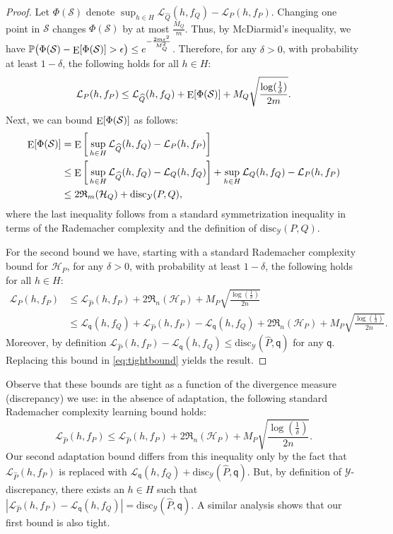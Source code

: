 \documentclass[twoside,11pt]{article}
\DeclareMathOperator*{\E}{\rm E}
\newcommand{\e}{\epsilon}
\newcommand{\h}{\widehat}
\newcommand{\cH}{{\mathcal H}}
\newcommand{\cL}{{\mathcal L}}
\newcommand{\cY}{{\mathcal Y}}
\newcommand{\1}{\mat{1}}
\newcommand{\qq}{{\mathsf q}}
\newcommand{\dis}{\mathrm{disc}}
\newcommand{\Rad}{\mathfrak{R}}
\begin{document}
\begin{proof}
  Let $\Phi(\mathcal{S})$ denote
$\sup_{h \in H} \cL_{\h Q}(h, f_Q) -  \cL_{P}(h, f_P)$. Changing one
point in $\mathcal{S}$ changes $\Phi(\mathcal{S})$ by at most
$\frac{M_Q}{m}$. Thus, by McDiarmid's inequality, we have
$\mathbb{P} \big( \Phi(\mathcal{S}) - \E[\Phi(\mathcal{S})] > \e \big) \leq
e^{-\frac{2 m \epsilon^2}{M_Q^2}}$. Therefore, for any $\delta > 0$,
with probability at least $1 - \delta$, the following holds for all $h \in H$:
\begin{equation*}
 \cL_{P} (h, f_P) \leq \cL_{\h Q}(h, f_Q) + \E[\Phi(\mathcal{S})]  + M_Q
 \sqrt{\frac{\log(\frac{1}{\delta})}{2 m}}.
\end{equation*}
Next, we can bound $\E[\Phi(\mathcal{S})]$ as follows:
\begin{align*}
 \E[\Phi(\mathcal{S})]
& = \E\bigg[\sup_{h \in H} \cL_{\h Q}(h, f_Q) - \cL_P(h, f_P) \bigg] \\
& \leq \E\bigg[\sup_{h \in H} \cL_{\h Q}(h, f_Q) - \cL_{Q}(h, f_Q)\bigg]  +
\sup_{h \in H} \cL_Q(h, f_Q) - \cL_P(h, f_P) \\
&\leq 2 \Rad_m(\cH_Q) + \dis_\cY(P, Q),
\end{align*}
where the last inequality follows from a standard symmetrization
inequality in terms of the Rademacher complexity and the definition of
$\dis_\cY(P, Q)$.

For the second bound we have, starting with a
standard Rademacher complexity bound for $\cH_P$, for any
$\delta > 0$, with probability at least $1 - \delta$, the following holds for
all $h \in H$:
\begin{align}
\cL_{P}(h, f_P) & \leq \cL_{\h P} (h, f_P) +  2 \Rad_n(\cH_P) + M_P
\sqrt{\frac{\log(\frac{1}{\delta})}{2 n}} \nonumber \\
\label{eq:tightbound}
& \leq \cL_{\qq}(h, f_Q) + \cL_{\h P} (h, f_P) - \cL_{\qq}(h, f_Q) +
2 \Rad_n(\cH_P) + M_P \sqrt{\frac{\log(\frac{1}{\delta})}{2
  n}}.
\end{align}
Moreover, by definition
$\cL_{\h P} (h, f_P) - \cL_{\qq}(h, f_Q) \leq \dis_\cY(\h P, \qq)$ for
any $\qq$. Replacing this bound in \eqref{eq:tightbound} yields the
result.
\end{proof}

Observe that these bounds are tight as a function of the divergence
measure (discrepancy) we use: in the absence of adaptation,
the following standard Rademacher complexity learning bound holds:
\begin{equation*}
\cL_{\h P}(h, f_P) \leq \cL_{\h P}(h, f_P) + 2 \Rad_n(\cH_P) + M_P
\sqrt{\frac{\log(\frac{1}{\delta})}{2 n}}.
\end{equation*}
Our second adaptation bound differs from this inequality only by the
fact that $\cL_{\h P}(h, f_P)$ is replaced with
 $\cL_{\qq}(h, f_Q) + \dis_\cY(\h P, \qq)$.  But, by definition of
$\cY$-discrepancy, there exists an $h \in H$ such that
$|\cL_{\h P}(h, f_P) - \cL_\qq(h, f_Q)| = \dis_\cY(\h P, \qq)$.
 A similar analysis shows that our first bound is also tight.
\end{document}
